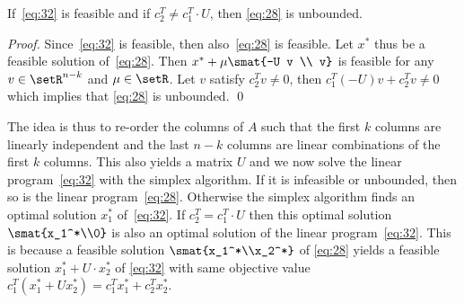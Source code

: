 \begin{lemma}
  \label{lem:8}
  If~\eqref{eq:32} is feasible and if $c_2^T \neq c_1^T\cdot U$, then
  \eqref{eq:28} is unbounded. 
\end{lemma}


\begin{proof}
  Since~\eqref{eq:32} is feasible, then also~\eqref{eq:28} is
  feasible. Let $x^*$ thus be a feasible solution
  of~\eqref{eq:28}. Then $x^* + \mu \smat{-U v \\ v}$ is feasible for
  any $v \in \setR^{n-k}$ and $\mu \in \setR$. Let $v$ satisfy $c_2^Tv \neq 0$,
  then $c_1^T (-U) v + c_2^T v \neq 0$ which implies that \eqref{eq:28}
  is unbounded. \qed 
\end{proof}


The idea is thus to re-order the columns of $A$ such that the first
$k$ columns are linearly independent and the last $n-k$ columns are
linear combinations of the first $k$ columns. This also yields a
matrix $U$ and we now solve the linear program~\eqref{eq:32} with the
simplex algorithm. If it is infeasible or unbounded, then so is the
linear program~\eqref{eq:28}. Otherwise the simplex algorithm finds an
optimal solution $x_1^*$  of~\eqref{eq:32}. If $c_2^T = c_1^T \cdot U$
then this optimal solution $\smat{x_1^*\\0}$ is also an optimal
solution of the linear program~\eqref{eq:32}. This is because a
feasible solution $\smat{x_1^*\\x_2^*}$ of \eqref{eq:28} yields a
feasible solution $x_1^*+U\cdot x_2^*$ of \eqref{eq:32} with same objective
value $c_1^T(x_1^* + U x_2^*) = c_1^Tx_1^* + c_2^Tx_2^*$. 



